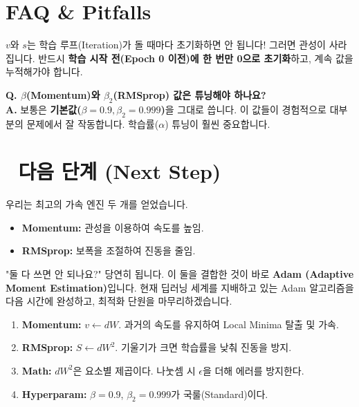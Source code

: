 \documentclass[11pt,a4paper]{book}
\theoremstyle{definition}
\begin{document}
\section{FAQ \& Pitfalls}

\begin{warningbox}[title={변수 초기화 실수}]
$v$와 $s$는 학습 루프(Iteration)가 돌 때마다 초기화하면 안 됩니다! 
그러면 관성이 사라집니다. 반드시 \textbf{학습 시작 전(Epoch 0 이전)에 한 번만 0으로 초기화}하고, 계속 값을 누적해가야 합니다.
\end{warningbox}

\textbf{Q. $\beta$(Momentum)와 $\beta_2$(RMSprop) 값은 튜닝해야 하나요?} \\
\textbf{A.} 보통은 \textbf{기본값($\beta=0.9, \beta_2=0.999$)}을 그대로 씁니다. 이 값들이 경험적으로 대부분의 문제에서 잘 작동합니다. 학습률($\alpha$) 튜닝이 훨씬 중요합니다.

\section*{🔗 다음 단계 (Next Step)}
우리는 최고의 가속 엔진 두 개를 얻었습니다.
\begin{itemize}
    \item \textbf{Momentum:} 관성을 이용하여 속도를 높임.
    \item \textbf{RMSprop:} 보폭을 조절하여 진동을 줄임.
\end{itemize}
"둘 다 쓰면 안 되나요?" 
당연히 됩니다. 이 둘을 결합한 것이 바로 \textbf{Adam (Adaptive Moment Estimation)}입니다. 현재 딥러닝 세계를 지배하고 있는 Adam 알고리즘을 다음 시간에 완성하고, 최적화 단원을 마무리하겠습니다.

\vspace{0.5cm}

\begin{summarybox}[title={단원 요약 (Cheat Sheet)}]
\begin{enumerate}
    \item \textbf{Momentum:} $v \leftarrow dW$. 과거의 속도를 유지하여 Local Minima 탈출 및 가속.
    \item \textbf{RMSprop:} $S \leftarrow dW^2$. 기울기가 크면 학습률을 낮춰 진동을 방지.
    \item \textbf{Math:} $dW^2$은 요소별 제곱이다. 나눗셈 시 $\epsilon$을 더해 에러를 방지한다.
    \item \textbf{Hyperparam:} $\beta=0.9$, $\beta_2=0.999$가 국룰(Standard)이다.
\end{enumerate}
\end{summarybox}
\end{document}
